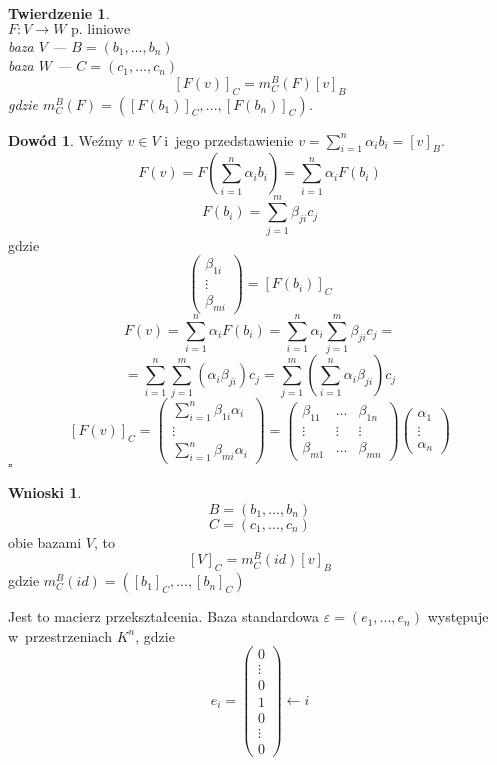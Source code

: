 \documentclass[12pt,a4paper]{article}
\renewcommand{\qed}{$\square$}
\theoremstyle{plain}
\newtheorem{tw}{Twierdzenie}[section]
\theoremstyle{definition}
\theoremstyle{definition}
\theoremstyle{definition}
\theoremstyle{definition}
\newtheorem*{dd}{Dowód}
\theoremstyle{definition}
\theoremstyle{definition}
\theoremstyle{definition}
\theoremstyle{definition}
\theoremstyle{definition}
\newtheorem*{wn}{Wnioski}
\begin{document}
\begin{tw} 
    ~\\
    $ F: V \rightarrow W \text{ p. liniowe}$ \\
    baza $V$ --- $B=(b_1, ..., b_n)$ \\
    baza $W$ --- $C=(c_1, ..., c_n)$ 
    $$ [F(v) ]_C = m^B_C(F)[v]_B $$ 
    gdzie $m^B_C(F)=([F(b_1)]_C, ..., [F(b_n)]_C)$.
\end{tw}

\begin{dd}
    Weźmy $v \in V$ i~jego przedstawienie $v=\sum\limits_{i=1}^n\alpha_ib_i = [v]_B$.
    \[F(v)=F\left(\sum_{i=1}^n\alpha_ib_i\right)=\sum_{i=1}^n\alpha_iF(b_i)\]
    \[F(b_i)=\sum_{j=1}^m\beta_{ji}c_j\]
    gdzie
    \[\begin{pmatrix}\beta_{1i} \\ \vdots \\ \beta_{mi}\end{pmatrix}=[F(b_i)]_C\]
    \[F(v)=\sum_{i=1}^n\alpha_iF(b_i)=\sum_{i=1}^n\alpha_i\sum_{j=1}^m\beta_{ji}c_j=\]
    \[=\sum_{i=1}^n\sum_{j=1}^m(\alpha_i\beta_{ji})c_j=\sum_{j=1}^m\left(\sum_{i=1}^n\alpha_i\beta_{ji}\right)c_j\]
    \[[F(v)]_C=\begin{pmatrix}\sum\limits_{i=1}^n\beta_{1i}\alpha_i\\ \vdots \\\sum\limits_{i=1}^n\beta_{mi}\alpha_i\end{pmatrix}=
     \begin{pmatrix}\beta_{11}& \dots &\beta_{1n}\\ \vdots & \vdots & \vdots\\\beta_{m1}& \dots&\beta_{mn}\end{pmatrix}
    \begin{pmatrix}\alpha_1\\ \vdots \\\alpha_n\end{pmatrix}  \] \hfill \qed
\end{dd}

\begin{wn}
    \[ B = (b_1, ..., b_n) \]
    \[ C = (c_1, ..., c_n) \]
    obie bazami $V$, to
    \[ [V]_C = m^B_C(id)[v]_B \]
    gdzie $m^B_C(id)=([b_1]_C, ..., [b_n]_C)$
    
    Jest to macierz przekształcenia.
    Baza standardowa $\varepsilon=(e_1, ..., e_n)$ występuje
    w~przestrzeniach $K^n$, gdzie
    \[e_i=\begin{pmatrix}0 \\ \vdots \\ 0 \\ 1 \\ 0 \\ \vdots \\ 0\end{pmatrix} \leftarrow i\]
\end{wn}
\end{document}
